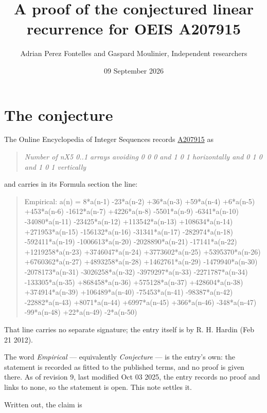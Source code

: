 \documentclass[11pt]{article}
\title{A proof of the conjectured linear recurrence for OEIS A207915}
\author{Adrian Perez Fontelles and Gaspard Moulinier, Independent researchers}
\date{09 September 2026}
\theoremstyle{definition}
\begin{document}
\maketitle
\section{The conjecture}

The Online Encyclopedia of Integer Sequences records \href{https://oeis.org/A207915}{A207915} as

\begin{quote}\itshape Number of nX5 0..1 arrays avoiding 0 0 0 and 1 0 1 horizontally and 0 1 0 and 1 0 1 vertically\end{quote}

and carries in its Formula section the line:

\begin{quote}\ttfamily Empirical: a(n) = 8*a(n-1) -23*a(n-2) +36*a(n-3) +59*a(n-4) +6*a(n-5) +453*a(n-6) -1612*a(n-7) +4226*a(n-8) -5501*a(n-9) -6341*a(n-10) -34080*a(n-11) -23425*a(n-12) +113542*a(n-13) +108634*a(n-14) +271953*a(n-15) -156132*a(n-16) -31341*a(n-17) -282974*a(n-18) -592411*a(n-19) -1006613*a(n-20) -2028890*a(n-21) -17141*a(n-22) +1219258*a(n-23) +3746047*a(n-24) +3773602*a(n-25) +5395370*a(n-26) +6760362*a(n-27) +4893258*a(n-28) +1462761*a(n-29) -1479940*a(n-30) -2078173*a(n-31) -3026258*a(n-32) -3979297*a(n-33) -2271787*a(n-34) -133305*a(n-35) +868458*a(n-36) +575128*a(n-37) +428604*a(n-38) +374914*a(n-39) +106489*a(n-40) -75453*a(n-41) -98387*a(n-42) -22882*a(n-43) +8071*a(n-44) +6997*a(n-45) +366*a(n-46) -348*a(n-47) -99*a(n-48) +22*a(n-49) -2*a(n-50)\end{quote}

That line carries no separate signature; the entry itself is by R. H. Hardin (Feb 21 2012).

The word {\itshape Empirical} --- equivalently {\itshape Conjecture} --- is the entry's own: the statement is recorded as fitted to the published terms, and no proof is given there. As of revision 9, last modified Oct 03 2025, the entry records no proof and links to none, so the statement is open. This note settles it.

Written out, the claim is
\end{document}
